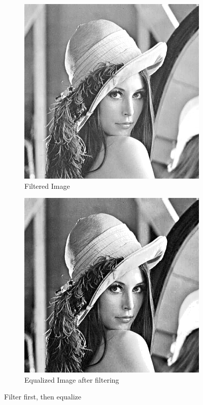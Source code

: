 \documentclass[11pt]{article}
\begin{document}
\begin{figure}[h]
\centering
\begin{subfigure}{.5\textwidth}
  \centering
  \includegraphics[width=.8\linewidth]{filter.png}
  \caption{Filtered Image}
  \label{fig:filter}
\end{subfigure}%
\begin{subfigure}{.5\textwidth}
  \centering
  \includegraphics[width=.8\linewidth]{filterEq.png}
  \caption{Equalized Image after filtering}
  \label{fig:filterEq}
\end{subfigure}
\caption{Filter first, then equalize}
\label{fig:FilterEq}
\end{figure}
\end{document}
